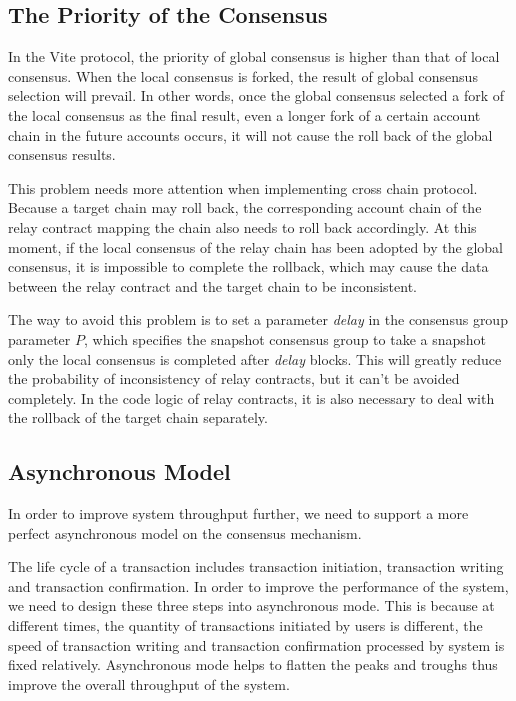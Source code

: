 \documentclass[UTF8,nofonts]{article}
\begin{document}
\begin{multicols}{2}
\subsection{The Priority of the Consensus}\label{sec:consensus-prio}
In the Vite protocol, the priority of global consensus is higher than that of local consensus. When the local consensus is forked, the result of global consensus selection will prevail. In other words, once the global consensus selected a fork of the local consensus as the final result, even a longer fork of a certain account chain in the future accounts occurs, it will not cause the roll back of the global consensus results.

This problem needs more attention when implementing cross chain protocol. Because a target chain may roll back, the corresponding account chain of the relay contract mapping the chain also needs to roll back accordingly. At this moment, if the local consensus of the relay chain has been adopted by the global consensus, it is impossible to complete the rollback, which may cause the data between the relay contract and the target chain to be inconsistent.

The way to avoid this problem is to set a parameter \textit{delay}  in the consensus group parameter $P$, which specifies the snapshot consensus group to take a snapshot only the local consensus is completed after \textit{delay} blocks. This will greatly reduce the probability of inconsistency of relay contracts, but it can’t be avoided completely. In the code logic of relay contracts, it is also necessary to deal with the rollback of the target chain separately.

\subsection{Asynchronous Model}
In order to improve system throughput further, we need to support a more perfect asynchronous model on the consensus mechanism.

The life cycle of a transaction includes transaction initiation, transaction writing and transaction confirmation. In order to improve the performance of the system, we need to design these three steps into asynchronous mode. This is because at different times, the quantity of transactions initiated by users is different, the speed of transaction writing and transaction confirmation processed by system is fixed relatively. Asynchronous mode helps to flatten the peaks and troughs thus improve the overall throughput of the system. 


\end{multicols}
\end{document}
